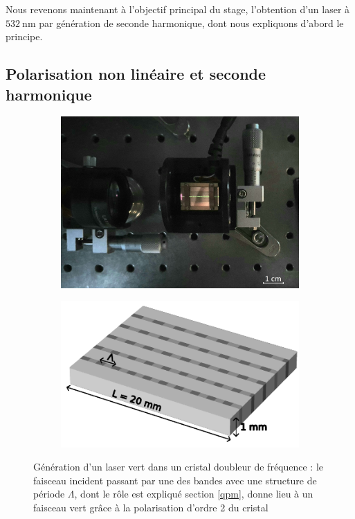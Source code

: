 \documentclass[11pt,a4paper] { article}
\newcommand{\lmbd}[1]{$\SI{#1}{\nano\metre}$}
\begin{document}
Nous revenons maintenant à l'objectif principal du stage, l'obtention d'un laser à \lmbd{532} par génération de seconde harmonique, dont nous expliquons d'abord le principe.

\subsection{Polarisation non linéaire et seconde harmonique} 

\begin{figure}[h]
\centering
\begin{subfigure}{0.45\textwidth}
	\includegraphics[width=\textwidth]{./img/cristal clair.jpg}
\end{subfigure}
\begin{subfigure}{0.5\textwidth}
	\includegraphics[width=\textwidth]{./img/cristal.pdf}
\end{subfigure}
\caption{Génération d'un laser vert dans un cristal doubleur de fréquence : \small le faisceau incident passant par une des bandes avec une structure de période $\Lambda$, dont le rôle est expliqué section \ref{qpm}, donne lieu à un faisceau vert grâce à la polarisation d'ordre 2 du cristal}
\label{fig:cristal}
\end{figure}
\end{document}

